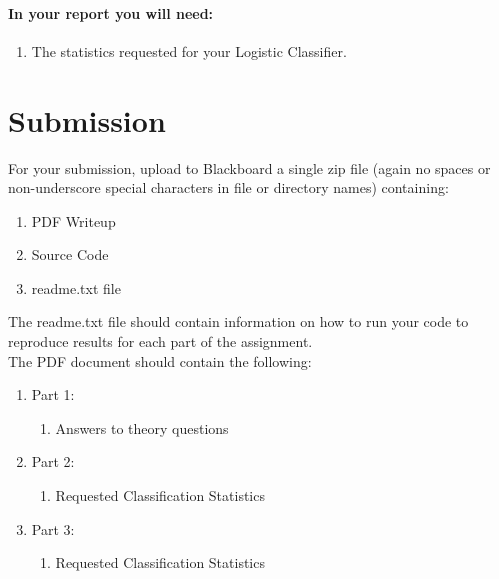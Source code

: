 \documentclass[12pt]{article}
\begin{document}
\paragraph{In your report you will need:}
\begin{enumerate}
\item The statistics requested for your Logistic Classifier.
\end{enumerate}


\newpage
\section*{Submission}
For your submission, upload to Blackboard a single zip file (again no spaces or non-underscore special characters in file or directory names) containing:

\begin{enumerate}
\item PDF Writeup
\item Source Code
\item readme.txt file
\end{enumerate}

\noindent
The readme.txt file should contain information on how to run your code to reproduce results for each part of the assignment.\\

\noindent
The PDF document should contain the following:

\begin{enumerate}
\item Part 1:
	\begin{enumerate}
	\item Answers to theory questions
	\end{enumerate}
\item Part 2:
	\begin{enumerate}
	\item Requested Classification Statistics
	\end{enumerate}
\item Part 3:
	\begin{enumerate}
	\item Requested Classification Statistics
\end{enumerate}
\end{enumerate}
\end{document}

